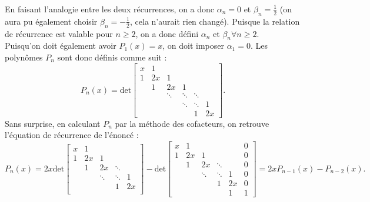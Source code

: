 En faisant l'analogie entre les deux récurrences,
on a donc $\alpha_n = 0$ et $\beta_n = \frac{1}{2}$
(on aura pu également choisir $\beta_n = -\frac{1}{2}$,
cela n'aurait rien changé).
Puisque la relation de récurrence est valable pour $n \geq 2$, on a donc défini $\alpha_n$ et $\beta_n \forall n \geq 2$.\\ Puisqu'on doit également avoir $P_1(x) = x$, on doit imposer $\alpha_1 = 0$. Les polynômes $P_n$ sont donc définis comme suit :
$$
P_n(x) = \text{det}
\left[
  \begin{array}{cccccc}
    x & 1 & & & &  \\
    1 & 2x & 1 & & & \\
      & 1 & 2x & 1 & & \\
      & & \ddots & \ddots & \ddots & \\
      & & & \ddots & \ddots &  1\\
      & & & &  1 & 2x
  \end{array}
\right].
$$
Sans surprise, en calculant $P_n$ par la méthode des cofacteurs, on retrouve l'équation de récurrence de l'énoncé :
$$
P_n(x) = 2x \text{det}
\left[
\begin{array}{ccccc}
x & 1 & & &  \\
1 & 2x & 1 & & \\
 & 1 & 2x & \ddots & \\
 & & \ddots & \ddots & 1  \\
 & & & 1 & 2x   \\
\end{array}
\right] - \text{det}
\left[
\begin{array}{cccccc}
x & 1 & & & & 0 \\
1 & 2x & 1 & & & 0\\
 & 1 & 2x & \ddots & & 0\\
 & & \ddots & \ddots & 1 & 0\\
 & & & 1 & 2x &  0\\
 & & & &  1 &  1
\end{array}
\right] = 2xP_{n-1}(x)-P_{n-2}(x).
$$

